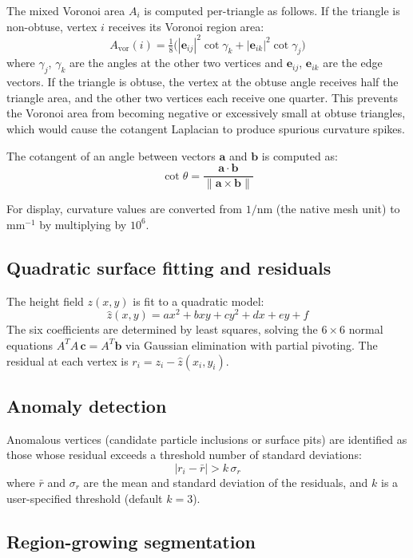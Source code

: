 \documentclass[11pt]{article}
\begin{document}
The mixed Voronoi area $A_i$ is computed per-triangle as follows.
If the triangle is non-obtuse, vertex $i$ receives its Voronoi
region area:
\[
  A_{\text{vor}}(i) = \tfrac{1}{8}
    \bigl(|\mathbf{e}_{ij}|^2 \cot\gamma_k
         + |\mathbf{e}_{ik}|^2 \cot\gamma_j\bigr)
\]
where $\gamma_j$, $\gamma_k$ are the angles at the other two
vertices and $\mathbf{e}_{ij}$, $\mathbf{e}_{ik}$ are the edge
vectors.  If the triangle is obtuse, the vertex at the obtuse angle
receives half the triangle area, and the other two vertices each
receive one quarter.  This prevents the Voronoi area from becoming
negative or excessively small at obtuse triangles, which would cause
the cotangent Laplacian to produce spurious curvature spikes.

The cotangent of an angle between vectors $\mathbf{a}$ and
$\mathbf{b}$ is computed as:
\[
  \cot\theta = \frac{\mathbf{a} \cdot \mathbf{b}}
    {\|\mathbf{a} \times \mathbf{b}\|}
\]

For display, curvature values are converted from $1/\text{nm}$
(the native mesh unit) to $\text{mm}^{-1}$ by multiplying by
$10^6$.

\subsection{Quadratic surface fitting and residuals}

The height field $z(x,y)$ is fit to a quadratic model:
\[
  \hat{z}(x,y) = ax^2 + bxy + cy^2 + dx + ey + f
\]
The six coefficients are determined by least squares, solving the
$6\times6$ normal equations $A^T\!A\,\mathbf{c} = A^T\!\mathbf{b}$
via Gaussian elimination with partial pivoting.  The residual at
each vertex is $r_i = z_i - \hat{z}(x_i, y_i)$.

\subsection{Anomaly detection}

Anomalous vertices (candidate particle inclusions or surface pits)
are identified as those whose residual exceeds a threshold number of
standard deviations:
\[
  |r_i - \bar{r}| > k\,\sigma_r
\]
where $\bar{r}$ and $\sigma_r$ are the mean and standard deviation
of the residuals, and $k$ is a user-specified threshold (default
$k=3$).

\subsection{Region-growing segmentation}
\end{document}
